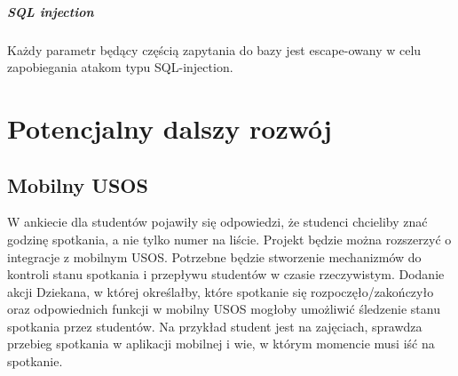 \documentclass[licencjacka]{pracamgr}
\begin{document}
\begin{itemize}
\paragraph{SQL injection}
Każdy parametr będący częścią zapytania do bazy jest escape-owany w celu zapobiegania atakom typu SQL-injection.




\chapter{Potencjalny dalszy rozwój}  \label{chap:rozwoj}

\section{Mobilny USOS}

W ankiecie dla studentów pojawiły się odpowiedzi, że studenci chcieliby znać godzinę spotkania, a nie tylko numer na liście. Projekt będzie można rozszerzyć o integracje z mobilnym USOS. Potrzebne będzie stworzenie mechanizmów do kontroli stanu spotkania i przepływu studentów w czasie rzeczywistym. Dodanie akcji Dziekana, w której określałby, które spotkanie się rozpoczęło/zakończyło oraz odpowiednich funkcji w mobilny USOS mogłoby umożliwić śledzenie stanu spotkania przez studentów. Na przykład student jest na zajęciach, sprawdza przebieg spotkania w aplikacji mobilnej i wie, w którym momencie musi iść na spotkanie.


\end{itemize}
\end{document}
